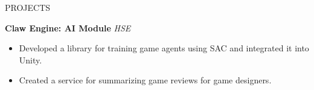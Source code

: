 \documentclass{resume}
\begin{document}
\begin{rSection}{PROJECTS}

\textbf{Claw Engine: AI Module}  
\textit{HSE}  
\begin{itemize}
    \itemsep -3pt {}
    \item Developed a library for training game agents using SAC and integrated it into Unity.
    \item Created a service for summarizing game reviews for game designers.
\end{itemize}

\end{rSection}
\end{document}
